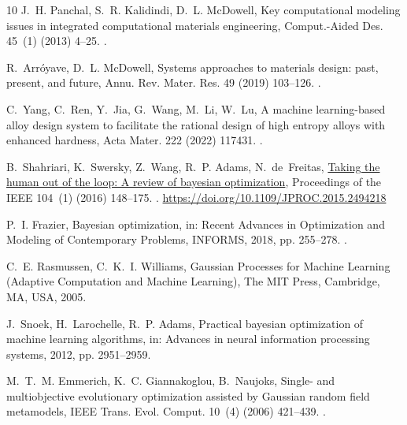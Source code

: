 \documentclass[preprint,12pt,times]{elsarticle}  %
\providecommand{\JournalTitle}[1]{#1}
\begin{document}
\begin{thebibliography}{10}
J.~H. Panchal, S.~R. Kalidindi, D.~L. McDowell, Key computational modeling
  issues in integrated computational materials engineering,
  {\JournalTitle{Comput.-Aided Des.}} 45~(1) (2013) 4--25.
\newblock \href {http://dx.doi.org/10.1016/j.cad.2012.06.006}
  {}.

R.~Arr{\'o}yave, D.~L. McDowell, Systems approaches to materials design: past,
  present, and future, {\JournalTitle{Annu. Rev. Mater. Res.}} 49
  (2019) 103--126.
\newblock \href {http://dx.doi.org/10.1146/annurev-matsci-070218-125955}
  {}.

C.~Yang, C.~Ren, Y.~Jia, G.~Wang, M.~Li, W.~Lu, A machine learning-based alloy
  design system to facilitate the rational design of high entropy alloys with
  enhanced hardness, {\JournalTitle{Acta Mater.}} 222 (2022) 117431.
\newblock \href {http://dx.doi.org/10.1016/j.actamat.2021.117431}
  {}.

B.~Shahriari, K.~Swersky, Z.~Wang, R.~P. Adams, N.~de~Freitas,
  \href{https://doi.org/10.1109/JPROC.2015.2494218}{Taking the human out of the
  loop: A review of bayesian optimization}, {\JournalTitle{Proceedings of the
  IEEE}} 104~(1) (2016) 148--175.
\newblock \href {http://dx.doi.org/10.1109/JPROC.2015.2494218}
  {}.
\newline\urlprefix\url{https://doi.org/10.1109/JPROC.2015.2494218}

P.~I. Frazier, {Bayesian} optimization, in: Recent Advances in Optimization and
  Modeling of Contemporary Problems, INFORMS, 2018, pp. 255--278.
\newblock \href {http://dx.doi.org/10.1287/educ.2018.0188}
  {}.

C.~E. Rasmussen, C.~K.~I. Williams, Gaussian Processes for Machine Learning
  (Adaptive Computation and Machine Learning), The MIT Press, Cambridge, MA,
  USA, 2005.

J.~Snoek, H.~Larochelle, R.~P. Adams, Practical bayesian optimization of
  machine learning algorithms, in: Advances in neural information processing
  systems, 2012, pp. 2951--2959.

M.~T.~M. Emmerich, K.~C. Giannakoglou, B.~Naujoks, Single- and multiobjective
  evolutionary optimization assisted by {Gaussian} random field metamodels,
  {\JournalTitle{IEEE Trans. Evol. Comput.}} 10~(4) (2006)
  421--439.
\newblock \href {http://dx.doi.org/10.1109/TEVC.2005.859463}
  {}.


\end{thebibliography}
\end{document}
